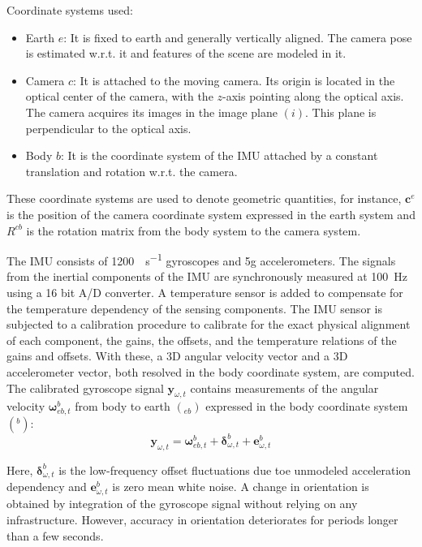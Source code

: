 Coordinate systems used:
\begin{itemize}
	\item Earth $ e $: It is fixed to earth and generally vertically aligned.  The camera pose is estimated w.r.t. it and features of the scene are modeled in it.
	\item Camera $ c $: It is attached to the moving camera. Its origin is 	located in the optical center of the camera, with the $ z $-axis pointing along the optical axis. The camera acquires its images in the image plane $ (i) $. This plane is perpendicular to the optical axis.
	\item Body $ b $: It is the coordinate system of the IMU attached by a constant translation and rotation w.r.t. the camera.
\end{itemize}

These coordinate systems are used to denote geometric quantities, for instance, $ \bm{c}^e $ is the position of the camera coordinate system expressed in the earth system and $ R^{cb} $ is the rotation matrix from the body system to the camera system.

The IMU consists of \SI{1200}{\deg\per\s} gyroscopes and 5g accelerometers. The signals from the inertial components of the IMU are synchronously measured at \SI{100}{\Hz} using a 16 bit A/D converter. A temperature sensor is added to compensate for the temperature dependency of the sensing components. The IMU sensor is subjected to a calibration procedure to calibrate for the exact physical alignment of each component, the gains, the offsets, and the temperature relations of the gains and offsets. With these, a 3D angular velocity vector and a 3D accelerometer vector, both resolved in the body coordinate system, are computed. The calibrated gyroscope signal $ \bm{y}_{\omega,t} $ contains measurements of the angular velocity $ \bm{\omega}^b_{eb,t} $ from body to earth $ ( _{eb} ) $ expressed in the body coordinate system $ ( ^b ) $:
\begin{equation}
\bm{y}_{\omega,t} = \bm{\omega}^b_{eb,t} + \bm{\delta}^b_{\omega,t} + \bm{e}^b_{\omega,t}
\end{equation}

Here, $ \bm{\delta}^b_{\omega,t} $ is the low-frequency offset fluctuations due toe unmodeled acceleration dependency and $ \bm{e}^b_{\omega,t} $ is zero mean white noise. A change in orientation is obtained by integration of the gyroscope signal without relying on any infrastructure. However, accuracy in orientation deteriorates for periods longer than a few seconds. 

